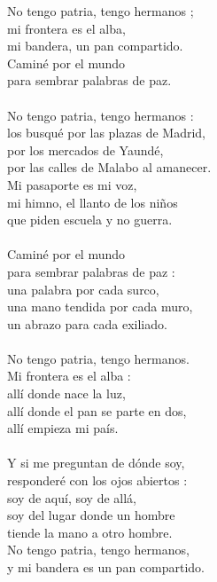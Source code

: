 \documentclass[11pt]{article}
\begin{document}
\begin{textebox}
No tengo patria, tengo hermanos ;\\
mi frontera es el alba,\\
mi bandera, un pan compartido.\\
Caminé por el mundo\\
para sembrar palabras de paz.\\
\\
No tengo patria, tengo hermanos :\\
los busqué por las plazas de Madrid,\\
por los mercados de Yaundé,\\
por las calles de Malabo al amanecer.\\
Mi pasaporte es mi voz,\\
mi himno, el llanto de los niños\\
que piden escuela y no guerra.\\
\\
Caminé por el mundo\\
para sembrar palabras de paz :\\
una palabra por cada surco,\\
una mano tendida por cada muro,\\
un abrazo para cada exiliado.\\
\\
No tengo patria, tengo hermanos.\\
Mi frontera es el alba :\\
allí donde nace la luz,\\
allí donde el pan se parte en dos,\\
allí empieza mi país.\\
\\
Y si me preguntan de dónde soy,\\
responderé con los ojos abiertos :\\
soy de aquí, soy de allá,\\
soy del lugar donde un hombre\\
tiende la mano a otro hombre.\\
No tengo patria, tengo hermanos,\\
y mi bandera es un pan compartido.
\end{textebox}
\end{document}
